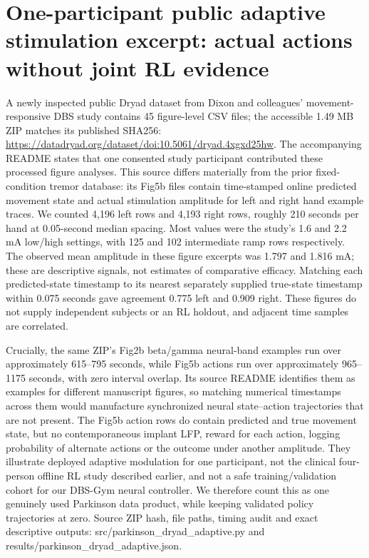 \section{One-participant public adaptive stimulation excerpt: actual actions without joint RL evidence}
A newly inspected public Dryad dataset from Dixon and colleagues' movement-responsive DBS study contains 45 figure-level CSV files; the accessible 1.49 MB ZIP matches its published SHA256: \url{https://datadryad.org/dataset/doi:10.5061/dryad.4xgxd25hw}. The accompanying README states that one consented study participant contributed these processed figure analyses. This source differs materially from the prior fixed-condition tremor database: its Fig5b files contain time-stamped online predicted movement state and actual stimulation amplitude for left and right hand example traces. We counted 4,196 left rows and 4,193 right rows, roughly 210 seconds per hand at 0.05-second median spacing. Most values were the study's 1.6 and 2.2 mA low/high settings, with 125 and 102 intermediate ramp rows respectively. The observed mean amplitude in these figure excerpts was 1.797 and 1.816 mA; these are descriptive signals, not estimates of comparative efficacy. Matching each predicted-state timestamp to its nearest separately supplied true-state timestamp within 0.075 seconds gave agreement 0.775 left and 0.909 right. These figures do not supply independent subjects or an RL holdout, and adjacent time samples are correlated.

Crucially, the same ZIP's Fig2b beta/gamma neural-band examples run over approximately 615--795 seconds, while Fig5b actions run over approximately 965--1175 seconds, with zero interval overlap. Its source README identifies them as examples for different manuscript figures, so matching numerical timestamps across them would manufacture synchronized neural state--action trajectories that are not present. The Fig5b action rows do contain predicted and true movement state, but no contemporaneous implant LFP, reward for each action, logging probability of alternate actions or the outcome under another amplitude. They illustrate deployed adaptive modulation for one participant, not the clinical four-person offline RL study described earlier, and not a safe training/validation cohort for our DBS-Gym neural controller. We therefore count this as one genuinely used Parkinson data product, while keeping validated policy trajectories at zero. Source ZIP hash, file paths, timing audit and exact descriptive outputs: src/parkinson\_dryad\_adaptive.py and results/parkinson\_dryad\_adaptive.json.

